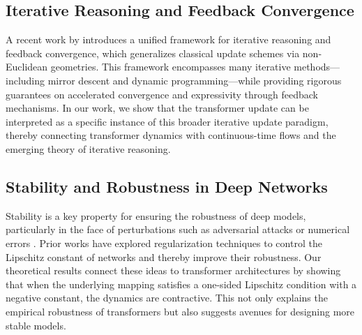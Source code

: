 \subsection{Iterative Reasoning and Feedback Convergence}
A recent work by \citet{feinashley2025iterate} introduces a unified framework for iterative reasoning and feedback convergence, which generalizes classical update schemes via non-Euclidean geometries. This framework encompasses many iterative methods—including mirror descent and dynamic programming—while providing rigorous guarantees on accelerated convergence and expressivity through feedback mechanisms. In our work, we show that the transformer update can be interpreted as a specific instance of this broader iterative update paradigm, thereby connecting transformer dynamics with continuous-time flows and the emerging theory of iterative reasoning.

\subsection{Stability and Robustness in Deep Networks}
Stability is a key property for ensuring the robustness of deep models, particularly in the face of perturbations such as adversarial attacks or numerical errors \citep{cisse2017parseval,miyato2018spectral}. Prior works have explored regularization techniques to control the Lipschitz constant of networks and thereby improve their robustness. Our theoretical results connect these ideas to transformer architectures by showing that when the underlying mapping satisfies a one-sided Lipschitz condition with a negative constant, the dynamics are contractive. This not only explains the empirical robustness of transformers but also suggests avenues for designing more stable models.
